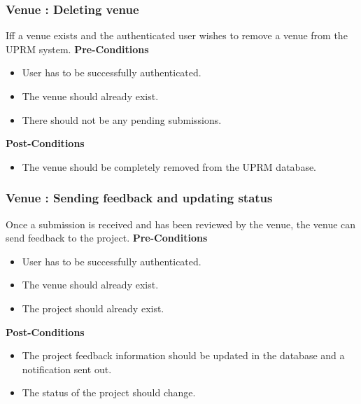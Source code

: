 \subsubsection{Venue : Deleting venue}
Iff a venue exists and the authenticated user wishes to remove a venue from the UPRM system.
\textbf{Pre-Conditions}
\begin{itemize}
	\item User has to be successfully authenticated.
	\item The venue should already exist.
	\item There should not be any pending submissions.
\end{itemize}
\textbf{Post-Conditions}
\begin{itemize}
	\item The venue should be completely removed from the UPRM database.
\end{itemize}

\subsubsection{Venue : Sending feedback and updating status}
Once a submission is received and has been reviewed by the venue, the venue can send feedback to the project.
\textbf{Pre-Conditions}
\begin{itemize}
	\item User has to be successfully authenticated.
	\item The venue should already exist.
	\item The project should already exist.
\end{itemize}
\textbf{Post-Conditions}
\begin{itemize}
	\item The project feedback information should be updated in the database and a notification sent out.
	\item The status of the project should change.
\end{itemize}
